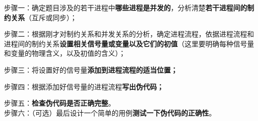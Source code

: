 {步骤一：确定题目涉及的若干进程中\textbf{哪些进程是并发的}}{{，}{分析清楚\textbf{若干进程间的制约关系}}}{（互斥或同步）；}

{步骤二：根据刚才对制约关系和并发关系的分析，确定进程流程}{，}{依据进程流程和进程间的制约关系\textbf{设置相关信号量或变量以及它们的初值}}{（这里要明确每种信号量和变量的物理含义，以及初值的含义）；}

{步骤三：将设置好的信号量\textbf{添加到进程流程的适当位置；}}

{步骤四：根据添加好信号量的进程流程\textbf{写出伪代码；}}

{步骤五：\textbf{检查伪代码是否正确完整}。}\\

{{步骤六：（可选）最后设}{{}{{}{{}{}}}}{计一个简单的用例\textbf{测试一下伪代码的正确性}。}}
